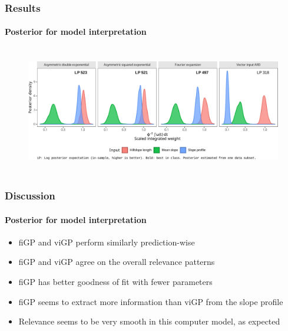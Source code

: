 \documentclass{snedecorbeamer}
\begin{document}
\begin{frame}
  \frametitle{Results}
  \framesubtitle{Posterior for model interpretation}

  \begin{figure}
    \centering
    \includegraphics[height=15em]{inc/wepp_weight_integral_mini.pdf}
  \end{figure}

\end{frame}

\begin{frame}
  \frametitle{Discussion}
  \framesubtitle{Posterior for model interpretation}

  \begin{itemize}
  \item fiGP and viGP perform similarly prediction-wise
  \item fiGP and viGP agree on the overall relevance patterns
  \item fiGP has better goodness of fit with fewer parameters
  \item fiGP seems to extract more information than viGP from the slope profile
  \item Relevance seems to be very smooth in this computer model, as expected
  \end{itemize}
\end{frame}
\end{document}

